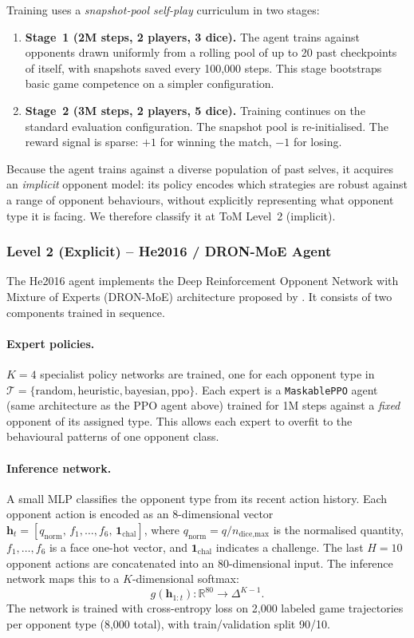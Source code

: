 \documentclass{article}
\begin{document}
  Training uses a \emph{snapshot-pool self-play} curriculum in two stages:
  \begin{enumerate}
    \item \textbf{Stage~1 (2M steps, 2 players, 3 dice).} The agent trains against
      opponents drawn uniformly from a rolling pool of up to 20 past checkpoints of
      itself, with snapshots saved every 100{,}000 steps. This stage bootstraps
      basic game competence on a simpler configuration.
    \item \textbf{Stage~2 (3M steps, 2 players, 5 dice).} Training continues on
      the standard evaluation configuration. The snapshot pool is re-initialised.
      The reward signal is sparse: $+1$ for winning the match, $-1$ for losing.
  \end{enumerate}
  Because the agent trains against a diverse population of past selves, it
  acquires an \emph{implicit} opponent model: its policy encodes which strategies
  are robust against a range of opponent behaviours, without explicitly
  representing what opponent type it is facing. We therefore classify it at ToM
  Level~2 (implicit).

  \subsubsection{Level 2 (Explicit) -- He2016 / DRON-MoE Agent}

  The He2016 agent implements the Deep Reinforcement Opponent Network with Mixture
  of Experts (DRON-MoE) architecture proposed by \citet{he2016opponent}. It
  consists of two components trained in sequence.

  \paragraph{Expert policies.} $K = 4$ specialist policy networks are trained, one
  for each opponent type in $\mathcal{T} = \{\text{random}, \text{heuristic},
  \text{bayesian}, \text{ppo}\}$. Each expert is a \texttt{MaskablePPO} agent
  (same architecture as the PPO agent above) trained for 1M steps against a
  \emph{fixed} opponent of its assigned type. This allows each expert to overfit to
  the behavioural patterns of one opponent class.

  \paragraph{Inference network.} A small MLP classifies the opponent type from its
  recent action history. Each opponent action is encoded as an 8-dimensional vector
  $\mathbf{h}_t = [q_{\text{norm}},\, f_1,\ldots,f_6,\, \mathbf{1}_{\text{chal}}]$,
  where $q_{\text{norm}} = q / n_{\text{dice,max}}$ is the normalised quantity,
  $f_1,\ldots,f_6$ is a face one-hot vector, and $\mathbf{1}_{\text{chal}}$
  indicates a challenge. The last $H = 10$ opponent actions are concatenated into
  an 80-dimensional input. The inference network maps this to a $K$-dimensional
  softmax:
  \[
    g(\mathbf{h}_{1:t}) : \mathbb{R}^{80} \to \Delta^{K-1}.
  \]
  The network is trained with cross-entropy loss on 2{,}000 labeled game
  trajectories per opponent type (8{,}000 total), with train/validation split
  90/10.
\end{document}
